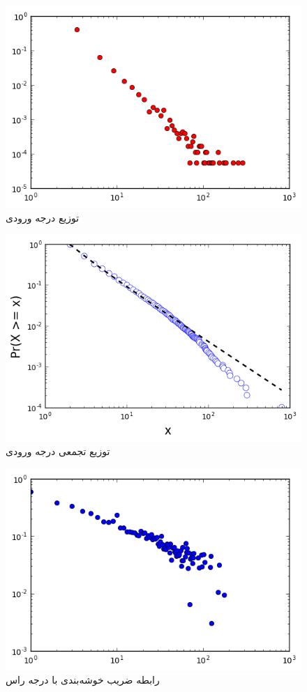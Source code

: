 \documentclass[11pt]{article}
\begin{document}
\begin{figure}[!h]
\caption{توزیع درجه ورودی}
\centering
\includegraphics[height=0.4\textheight]{in-degree-distribution}
\end{figure}
\begin{figure}[!h]
\caption{توزیع تجمعی درجه ورودی}
\centering
\includegraphics[height=0.4\textheight]{in-degree-distribution-exponent}
\end{figure}
\begin{figure}[!h]
\caption{رابطه ضریب خوشه‌بندی با درجه راس}
\centering
\includegraphics[height=0.4\textheight]{coeffition-degree}
\end{figure}
\end{document}
